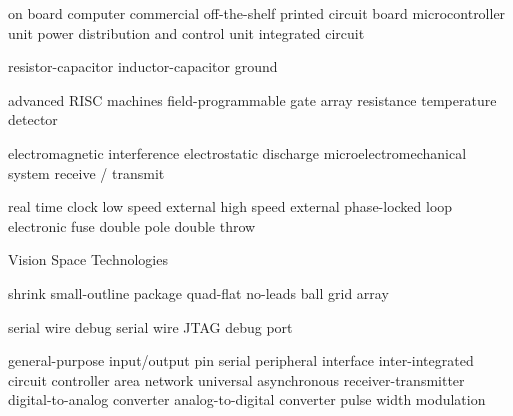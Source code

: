      {on board computer}
    {commercial off-the-shelf}
     {printed circuit board}
     {microcontroller unit}
    {power distribution and control unit}
      {integrated circuit}

      {resistor-capacitor}
      {inductor-capacitor}
     {ground}

     {advanced RISC machines}
    {field-programmable gate array}
     {resistance temperature detector}

     {electromagnetic interference}
     {electrostatic discharge}
    {microelectromechanical system}
   {receive / transmit}

     {real time clock}
     {low speed external}
     {high speed external}
     {phase-locked loop}
   {electronic fuse}
    {double pole double throw}

     {Vision Space Technologies}

    {shrink small-outline package}
     {quad-flat no-leads}
     {ball grid array}

     {serial wire debug}
  {serial wire JTAG debug port}

    {general-purpose input/output pin}
     {serial peripheral interface}
 {inter-integrated circuit}
     {controller area network}
    {universal asynchronous receiver-transmitter}
     {digital-to-analog converter}
     {analog-to-digital converter}
     {pulse width modulation}
